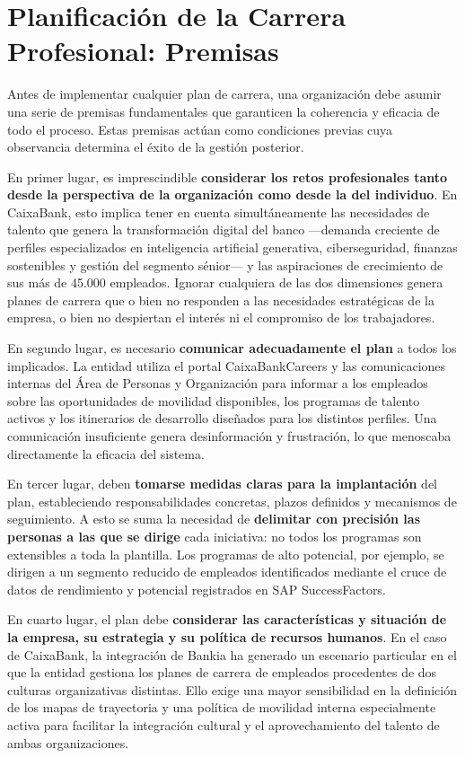 \section{Planificación de la Carrera Profesional: Premisas}

Antes de implementar cualquier plan de carrera, una organización debe asumir una serie de
premisas fundamentales que garanticen la coherencia y eficacia de todo el proceso. Estas
premisas actúan como condiciones previas cuya observancia determina el éxito de la gestión
posterior.

En primer lugar, es imprescindible \textbf{considerar los retos profesionales tanto desde la
perspectiva de la organización como desde la del individuo}. En CaixaBank, esto implica tener
en cuenta simultáneamente las necesidades de talento que genera la transformación digital del
banco —demanda creciente de perfiles especializados en inteligencia artificial generativa,
ciberseguridad, finanzas sostenibles y gestión del segmento sénior— y las aspiraciones de
crecimiento de sus más de 45.000 empleados. Ignorar cualquiera de las dos dimensiones genera
planes de carrera que o bien no responden a las necesidades estratégicas de la empresa, o bien
no despiertan el interés ni el compromiso de los trabajadores.

En segundo lugar, es necesario \textbf{comunicar adecuadamente el plan} a todos los implicados.
La entidad utiliza el portal CaixaBankCareers y las comunicaciones internas del Área de Personas
y Organización para informar a los empleados sobre las oportunidades de movilidad disponibles,
los programas de talento activos y los itinerarios de desarrollo diseñados para los distintos
perfiles. Una comunicación insuficiente genera desinformación y frustración, lo que menoscaba
directamente la eficacia del sistema.

En tercer lugar, deben \textbf{tomarse medidas claras para la implantación} del plan, estableciendo
responsabilidades concretas, plazos definidos y mecanismos de seguimiento. A esto se suma la
necesidad de \textbf{delimitar con precisión las personas a las que se dirige} cada iniciativa: no
todos los programas son extensibles a toda la plantilla. Los programas de alto potencial, por
ejemplo, se dirigen a un segmento reducido de empleados identificados mediante el cruce de datos
de rendimiento y potencial registrados en SAP SuccessFactors.

En cuarto lugar, el plan debe \textbf{considerar las características y situación de la empresa, su
estrategia y su política de recursos humanos}. En el caso de CaixaBank, la integración de Bankia
ha generado un escenario particular en el que la entidad gestiona los planes de carrera de
empleados procedentes de dos culturas organizativas distintas. Ello exige una mayor sensibilidad
en la definición de los mapas de trayectoria y una política de movilidad interna especialmente
activa para facilitar la integración cultural y el aprovechamiento del talento de ambas organizaciones.

